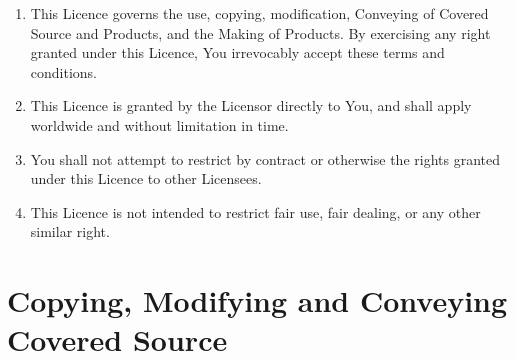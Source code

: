 \documentclass[10pt, a4paper]{article}
\begin{document}
\begin{enumerate}[label=\ref*{sec:applicability}.\arabic*]
\item This Licence governs the use, copying, modification, Conveying of Covered Source and Products, and the Making of Products. By exercising any right granted under this Licence, You irrevocably accept these terms and conditions.

\item This Licence is granted by the Licensor directly to You, and shall apply worldwide and without limitation in time. 

\item You shall not attempt to restrict by contract or otherwise the rights granted under this Licence to other Licensees.

\item This Licence is not intended to restrict fair use, fair dealing, or any other similar right.
\end{enumerate}

\section{Copying, Modifying and Conveying Covered Source}
\label{sec:copying}
\end{document}

